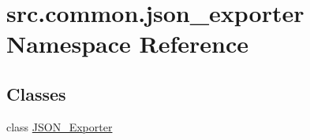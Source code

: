 \hypertarget{namespacesrc_1_1common_1_1json__exporter}{}\section{src.\+common.\+json\+\_\+exporter Namespace Reference}
\label{namespacesrc_1_1common_1_1json__exporter}
\subsection*{Classes}
\begin{DoxyCompactItemize}
\item 
class \hyperlink{classsrc_1_1common_1_1json__exporter_1_1JSON__Exporter}{J\+S\+O\+N\+\_\+\+Exporter}
\end{DoxyCompactItemize}
